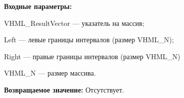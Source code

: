 \textbf{Входные параметры:}

 VHML\_ResultVector --- указатель на массив;
 
 Left --- левые границы интервалов (размер VHML\_N);
 
 Right --- правые границы интервалов (размер VHML\_N)
 
 VHML\_N --- размер массива.

\textbf{Возвращаемое значение:}
Отсутствует.